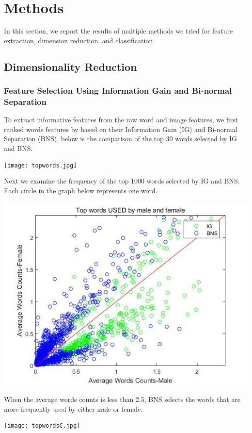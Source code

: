 \section{Methods}
In this section, we report the results of multiple methods we tried for feature extraction, dimension reduction, and classification. 


\subsection{Dimensionality Reduction}
\subsubsection{Feature Selection Using Information Gain and Bi-normal Separation}
To extract informative features from the raw word and image features,  we first ranked words features by based on their Information Gain (IG) and Bi-normal Separation (BNS), below is the comparison of the top 30 words selected by IG and BNS.   
\begin{center}
\texttt{[image: topwords.jpg]}
    \end{center}
Next we examine the frequency of the top 1000 words selected by IG and BNS. Each circle in the graph below represents one word.
\begin{center}
\includegraphics[scale=0.5]{topwordsB.jpg}
\end{center}
When the average words counts is less than 2.5, BNS selects the words that are more frequently used by either male or female.\\
\begin{center}
\texttt{[image: topwordsC.jpg]}
\end{center}
